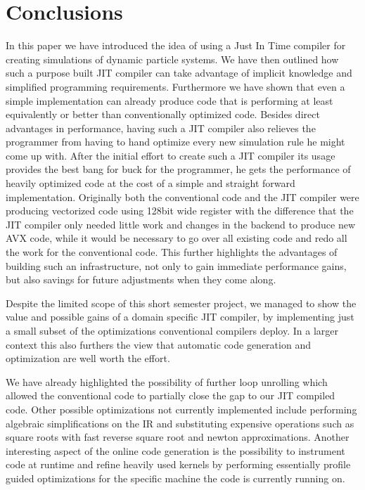\section{Conclusions}

In this paper we have introduced the idea of using a Just In Time compiler for creating simulations of dynamic particle systems. We have then outlined how such a purpose built JIT compiler can take advantage of implicit knowledge and simplified programming requirements. Furthermore we have shown that even a simple implementation can already produce code that is performing at least equivalently or better than conventionally optimized code. Besides direct advantages in performance, having such a JIT compiler also relieves the programmer from having to hand optimize every new simulation rule he might come up with. After the initial effort to create such a JIT compiler its usage provides the best bang for buck for the programmer, he gets the performance of heavily optimized code at the cost of a simple and straight forward implementation. Originally both the conventional code and the JIT compiler were producing vectorized code using 128bit wide register with the difference that the JIT compiler only needed little work and changes in the backend to produce new AVX code, while it would be necessary to go over all existing code and redo all the work for the conventional code. This further highlights the advantages of building such an infrastructure, not only to gain immediate performance gains, but also savings for future adjustments when they come along.

Despite the limited scope of this short semester project, we managed to show the value and possible gains of a domain specific JIT compiler, by implementing just a small subset of the optimizations conventional compilers deploy. In a larger context this also furthers the view that automatic code generation and optimization are well worth the effort.

We have already highlighted the possibility of further loop unrolling which allowed the conventional code to partially close the gap to our JIT compiled code. Other possible optimizations not currently implemented include performing algebraic simplifications on the IR and substituting expensive operations such as square roots with fast reverse square root and newton approximations. Another interesting aspect of the online code generation is the possibility to instrument code at runtime and refine heavily used kernels by performing essentially profile guided optimizations for the specific machine the code is currently running on.
